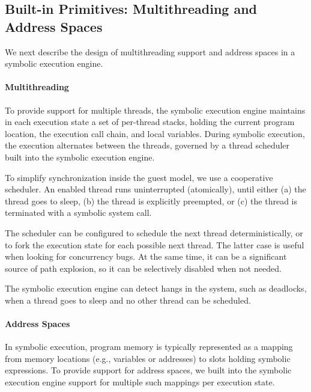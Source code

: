 \subsection{Built-in Primitives: Multithreading and Address Spaces}
\label{sec:cloud9:primitives}

We next describe the design of multithreading support and address spaces in a symbolic execution engine.

\paragraph{Multithreading}

To provide support for multiple threads, the symbolic execution engine maintains in each execution state a set of per-thread stacks, holding the current program location, the execution call chain, and local variables.
%
During symbolic execution, the execution alternates between the threads, governed by a thread scheduler built into the symbolic execution engine.

To simplify synchronization inside the guest model, we use a cooperative scheduler.  An enabled thread runs uninterrupted (atomically), until either (a) the thread goes to sleep, (b) the thread is explicitly preempted, or (c) the thread is terminated with a symbolic system call.

The scheduler can be configured to schedule the next thread deterministically, or to fork the execution state for each possible next thread.
%
The latter case is useful when looking for concurrency bugs.  At the same time, it can be a significant source of path explosion, so it can be selectively disabled when not needed.

The symbolic execution engine can detect hangs in the system, such as deadlocks, when a thread goes to sleep and no other thread can be scheduled.

\paragraph{Address Spaces}

In symbolic execution, program memory is typically represented as a mapping from memory locations (e.g., variables or addresses) to slots holding symbolic expressions.
%
To provide support for address spaces, we built into the symbolic execution engine support for multiple such mappings per execution state.

